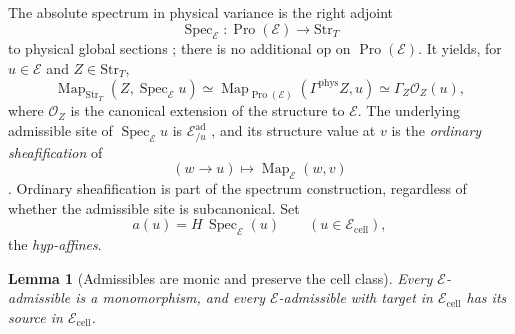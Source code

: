 \documentclass[12pt]{amsart}
\newtheorem{lem}[thm]{Lemma}
\theoremstyle{definition}
\theoremstyle{remark}
\numberwithin{equation}{section}
\newcommand{\E}{\mathcal E}
\newcommand{\op}{\mathrm{op}}
\DeclareMathOperator{\Map}{Map}
\DeclareMathOperator{\Spec}{Spec}
\begin{document}
The absolute spectrum in physical variance is the right adjoint
\begin{equation}
\label{eq:banach-spec-adjunction}
 \Spec_{\E}\colon\operatorname{Pro}(\E)\longrightarrow\mathrm{Str}_T
\end{equation}
to physical global sections
\cite[Notation~2.2.1, p.~43]{LurieDAGV2009}; there is no additional
$\op$ on $\operatorname{Pro}(\E)$. It yields, for $u\in\E$ and
$Z\in\mathrm{Str}_T$,
\begin{equation}
\label{eq:banach-spec-formula}
 \Map_{\mathrm{Str}_T}(Z,\Spec_{\E}u)
 \simeq
 \Map_{\operatorname{Pro}(\E)}(\Gamma^{\mathrm{phys}}Z,u)
 \simeq\Gamma_Z\mathcal O_Z(u),
\end{equation}
where $\mathcal O_Z$ is the canonical extension of the structure to
$\E$. The underlying admissible site of $\Spec_{\E}u$ is
$\E^{\mathrm{ad}}_{/u}$ \cite[Definition~2.2.9,
p.~46]{LurieDAGV2009}, and its structure value at $v$ is the
\emph{ordinary sheafification} of
\begin{equation}
\label{eq:banach-eval-presheaf}
 (w\to u)\longmapsto\Map_{\E}(w,v)
\end{equation}
\cite[Proposition~2.2.11 and Theorem~2.2.12,
p.~47]{LurieDAGV2009}. Ordinary sheafification is part of the
spectrum construction, regardless of whether the admissible site
is subcanonical. Set
\begin{equation}
\label{eq:banach-hyp-affine}
 a(u)=H\,\Spec_{\E}(u)\qquad(u\in\E_{\mathrm{cell}}),
\end{equation}
the \emph{hyp-affines}.

\begin{lem}[Admissibles are monic and preserve the cell class]
\label{lem:banach-admissible-mono}
Every $\E$-admissible is a monomorphism, and every $\E$-admissible
with target in $\E_{\mathrm{cell}}$ has its source in
$\E_{\mathrm{cell}}$.
\end{lem}
\end{document}
